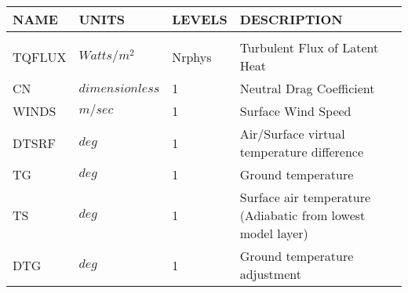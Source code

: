 \newpage
\vspace*{\fill}
\begin{tabular}{llll}
\hline\hline
 NAME & UNITS & LEVELS & DESCRIPTION \\
\hline

&\\
 TQFLUX   &  $Watts/m^2$ &  Nrphys
     &\begin{minipage}[t]{3in}
      {Turbulent Flux of Latent Heat}
     \end{minipage}\\
 CN       &  $dimensionless$ &  1
     &\begin{minipage}[t]{3in}
      {Neutral Drag Coefficient}
     \end{minipage}\\
 WINDS     &  $m/sec$ &  1
     &\begin{minipage}[t]{3in}
      {Surface Wind Speed}
     \end{minipage}\\
 DTSRF     &  $deg$ &  1
     &\begin{minipage}[t]{3in}
      {Air/Surface virtual temperature difference}
     \end{minipage}\\
 TG        &  $deg$ &  1
     &\begin{minipage}[t]{3in}
      {Ground temperature}
     \end{minipage}\\
 TS        &  $deg$ &  1
     &\begin{minipage}[t]{3in}
      {Surface air temperature (Adiabatic from lowest model layer)}
     \end{minipage}\\
 DTG       &  $deg$ &  1
     &\begin{minipage}[t]{3in}
      {Ground temperature adjustment}
     \end{minipage}\\


\end{tabular}
